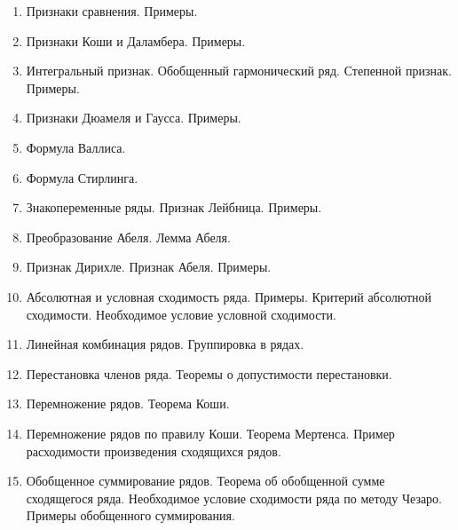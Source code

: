 \documentclass[../main.tex]{subfiles}
\begin{document}
\begin{enumerate}
  \item Признаки сравнения. Примеры.
  \item Признаки Коши и Даламбера. Примеры.
  \item Интегральный признак. Обобщенный гармонический ряд. Степенной признак. 
  Примеры.
  \item Признаки Дюамеля и Гаусса. Примеры.
  \item Формула Валлиса.
  \item Формула Стирлинга.
  \item Знакопеременные ряды. Признак Лейбница. Примеры.
  \item Преобразование Абеля. Лемма Абеля.
  \item Признак Дирихле. Признак Абеля. Примеры.
  \item Абсолютная и условная сходимость ряда. Примеры. Критерий абсолютной 
  сходимости. Необходимое условие условной сходимости.
  \item Линейная комбинация рядов. Группировка в рядах.
  \item Перестановка членов ряда. Теоремы о допустимости перестановки.
  \item Перемножение рядов. Теорема Коши.
  \item Перемножение рядов по правилу Коши. Теорема Мертенса. Пример 
  расходимости произведения сходящихся рядов.
  \item Обобщенное суммирование рядов. Теорема об обобщенной сумме сходящегося 
  ряда. Необходимое условие сходимости ряда по методу Чезаро. Примеры 
  обобщенного суммирования.
 \end{enumerate}
\end{document}
